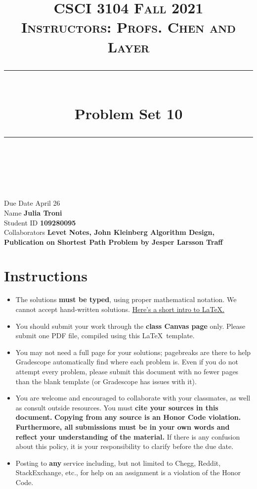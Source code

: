 \documentclass[11pt]{article}
\title{
\normalfont \normalsize 
\textsc{CSCI 3104 Fall 2021 \\ 
Instructors: Profs. Chen and Layer} \\
[10pt] 
\rule{\linewidth}{0.5pt} \\[6pt] 
\huge Problem Set 10 \\
\rule{\linewidth}{2pt}  \\[10pt]
}
\date{}
\theoremstyle{definition}
\theoremstyle{definition}
\theoremstyle{definition}
\begin{document}
\maketitle


\noindent
Due Date \dotfill April 26 \\
Name \dotfill \textbf{Julia Troni} \\
Student ID \dotfill \textbf{109280095} \\
Collaborators \dotfill \textbf{Levet Notes, John Kleinberg Algorithm Design, Publication on Shortest Path Problem by Jesper Larsson Traff}

\tableofcontents

\section{Instructions}
 \begin{itemize}
	\item The solutions \textbf{must be typed}, using proper mathematical notation. We cannot accept hand-written solutions. \href{http://ece.uprm.edu/~caceros/latex/introduction.pdf}{Here's a short intro to \LaTeX.}
	\item You should submit your work through the \textbf{class Canvas page} only. Please submit one PDF file, compiled using this \LaTeX \ template.
	\item You may not need a full page for your solutions; pagebreaks are there to help Gradescope automatically find where each problem is. Even if you do not attempt every problem, please submit this document with no fewer pages than the blank template (or Gradescope has issues with it).

	\item You are welcome and encouraged to collaborate with your classmates, as well as consult outside resources. You must \textbf{cite your sources in this document.} \textbf{Copying from any source is an Honor Code violation. Furthermore, all submissions must be in your own words and reflect your understanding of the material.} If there is any confusion about this policy, it is your responsibility to clarify before the due date. 

	\item Posting to \textbf{any} service including, but not limited to Chegg, Reddit, StackExchange, etc., for help on an assignment is a violation of the Honor Code.
\end{itemize}
\end{document}
